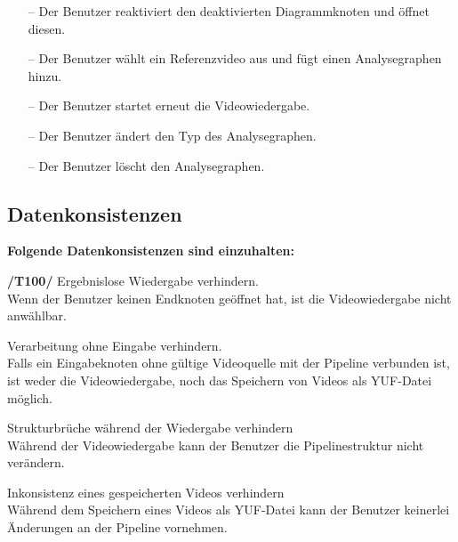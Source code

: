 \begin{description}
\begin{itemize}
			\item[--] Der Benutzer reaktiviert den deaktivierten Diagrammknoten und öffnet diesen.
			\item[--] Der Benutzer wählt ein Referenzvideo aus und fügt einen Analysegraphen hinzu.
			\item[--] Der Benutzer startet erneut die Videowiedergabe.
			\item[--] Der Benutzer ändert den Typ des Analysegraphen.
			\item[--] Der Benutzer löscht den Analysegraphen.
		\end{itemize}
\end{description}

\newpage

\subsection{Datenkonsistenzen}

\textbf{Folgende Datenkonsistenzen sind einzuhalten:}

\begin{description}
	\item\textbf{/T100/} Ergebnislose Wiedergabe verhindern. ~\\
		Wenn der Benutzer keinen Endknoten geöffnet hat, ist die Videowiedergabe nicht anwählbar.
	\item[/T110/] Verarbeitung ohne Eingabe verhindern. ~\\
		Falls ein Eingabeknoten ohne gültige Videoquelle mit der Pipeline verbunden ist, ist weder die Videowiedergabe, noch das Speichern von Videos als YUF-Datei möglich.
	\item[/T120/] Strukturbrüche während der Wiedergabe verhindern ~\\
		Während der Videowiedergabe kann der Benutzer die Pipelinestruktur nicht verändern.
	\item[/T130/] Inkonsistenz eines gespeicherten Videos verhindern ~\\
		Während dem Speichern eines Videos als YUF-Datei kann der Benutzer keinerlei Änderungen an der Pipeline vornehmen.
\end{description}
